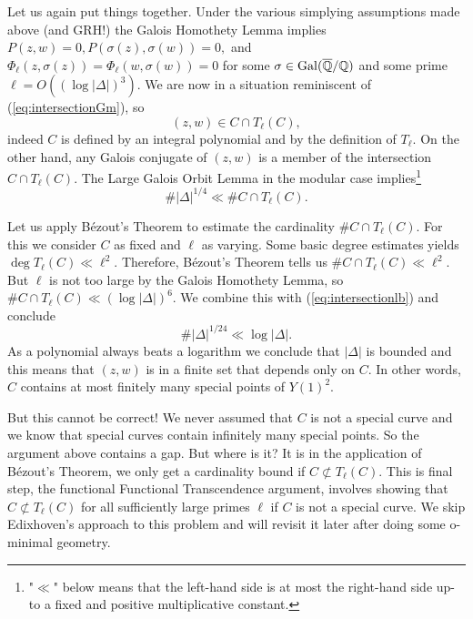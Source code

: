 Let us again put things together. Under the various simplying
assumptions made above (and GRH!) the Galois Homothety Lemma implies $P(z,w)=0, P(\sigma(z),\sigma(w))=0,$
and $\Phi_\ell(z,\sigma(z))=\Phi_\ell(w,\sigma(w))=0$ for some
$\sigma\in\mathrm{Gal}({\overline{\mathbb{Q}}}/{\mathbb{Q}})$ and some prime
$\ell = O((\log|\Delta|)^3)$. We are now in a situation reminiscent of (\ref{eq:intersectionGm}), so
\begin{equation*}
  (z,w) \in C \cap T_\ell(C),  
\end{equation*}
indeed $C$ is defined by an integral polynomial and by the definition of
$T_\ell$.
On the other hand, any Galois conjugate of $(z,w)$ is a member of the
intersection $C\cap T_\ell(C)$. The Large Galois Orbit Lemma in the
modular case implies\footnote{"$\ll$" below means that the left-hand side is
      at most the right-hand side up-to a fixed and positive
      multiplicative constant.}
\begin{equation}
  \label{eq:intersectionlb}
  \#|\Delta|^{1/4} \ll \# C\cap
  T_\ell(C).
\end{equation}

Let us apply B\'ezout's Theorem to estimate the cardinality $\# C\cap
T_\ell(C)$. For this we consider $C$ as fixed and $\ell$ as varying.
Some basic degree estimates yields $\deg T_\ell(C) \ll \ell^2$.
Therefore, B\'ezout's Theorem tells us $\#C\cap T_\ell(C)\ll \ell^2$.
But $\ell$ is not too large by the Galois Homothety Lemma, so
$\# C\cap T_\ell(C)\ll (\log|\Delta|)^6$. 
We combine this with (\ref{eq:intersectionlb}) and conclude
\begin{equation*}
  \#|\Delta|^{1/24} \ll \log|\Delta|.
\end{equation*}
As a polynomial always  beats a logarithm  we conclude that $|\Delta|$
is bounded and this means that $(z,w)$ is in a finite set that depends
only on $C$. In other words, $C$ contains at most finitely many
special points of $Y(1)^2$.

But this cannot be correct! We never assumed that $C$ is not a special
curve and we know that special curves contain infinitely many special
points. So the argument above contains a gap. But where is it? It is
in the application of B\'ezout's Theorem, we only get a cardinality
bound if $C\not\subset T_\ell(C)$. This is final step, the functional
Functional Transcendence argument, involves showing that $C\not\subset
T_\ell(C)$ for all sufficiently large primes $\ell$ if $C$ is not a
special curve. We skip Edixhoven's approach to this problem and will
revisit it later after doing some o-minimal geometry. 




